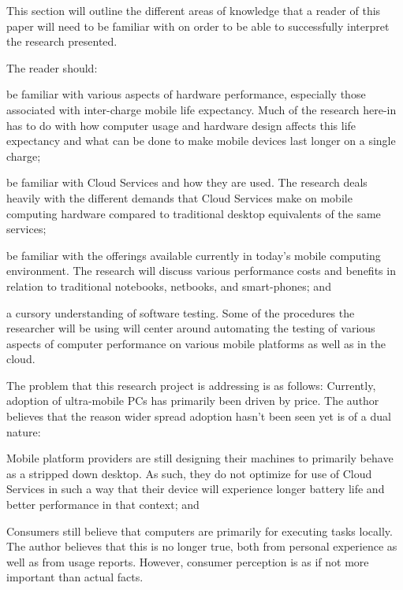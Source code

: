 This section will outline the different areas of knowledge that a reader of this
paper will need to be familiar with on order to be able to successfully
interpret the research presented.

The reader should:
\begin{inparaenum}[(1)]
\item be familiar with various aspects of hardware performance, especially those
  associated with inter-charge mobile life expectancy.  Much of the research
  here-in has to do with how computer usage and hardware design affects this
  life expectancy and what can be done to make mobile devices last longer on a
  single charge;
\item be familiar with Cloud Services and how they are used.  The research deals
  heavily with the different demands that Cloud Services make on mobile
  computing hardware compared to traditional desktop equivalents of the same
  services;
\item be familiar with the offerings available currently in today's mobile
  computing environment.  The research will discuss various performance costs
  and benefits in relation to traditional notebooks, netbooks, and smart-phones;
  and
\item a cursory understanding of software testing.  Some of the procedures the
  researcher will be using will center around automating the testing of various
  aspects of computer performance on various mobile platforms as well as in the
  cloud.
\end{inparaenum}

The problem that this research project is addressing is as follows: Currently,
adoption of ultra-mobile PCs has primarily been driven by price.  The author
believes that the reason wider spread adoption hasn't been seen yet is of a dual
nature:
\begin{inparaenum}[(1)]
\item Mobile platform providers are still designing their machines to primarily
  behave as a stripped down desktop.  As such, they do not optimize for use of
  Cloud Services in such a way that their device will experience longer battery
  life and better performance in that context; and
\item Consumers still believe that computers are primarily for executing tasks
  locally.  The author believes that this is no longer true, both from personal
  experience as well as from usage reports.  However, consumer perception is as
  if not more important than actual facts.
\end{inparaenum}

